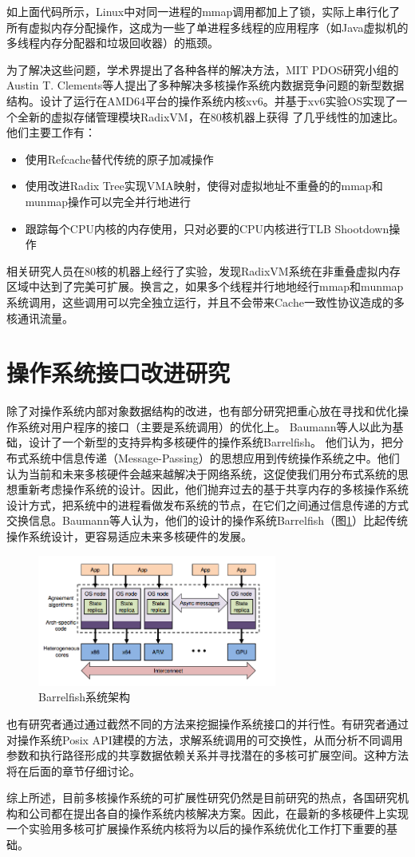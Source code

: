 如上面代码所示，Linux中对同一进程的mmap调用都加上了锁，实际上串行化了所有虚拟内存分配操作，这成为一些了单进程多线程的应用程序（如Java虚拟机的多线程内存分配器和垃圾回收器）的瓶颈。

为了解决这些问题，学术界提出了各种各样的解决方法，MIT
PDOS研究小组的Austin T. Clements等人提出了多种解决多核操作系统内数据竞争问题的新型数据结构\cite{radixvm:eurosys13}。设计了运行在AMD64平台的操作系统内核xv6。并基于xv6实验OS实现了一个全新的虚拟存储管理模块RadixVM，在80核机器上获得
了几乎线性的加速比。他们主要工作有：
\begin{itemize}
\item 使用Refcache替代传统的原子加减操作
\item 使用改进Radix
Tree实现VMA映射，使得对虚拟地址不重叠的的mmap和munmap操作可以完全并行地进行
\item 跟踪每个CPU内核的内存使用，只对必要的CPU内核进行TLB Shootdown操作
\end{itemize}

相关研究人员在80核的机器上经行了实验，发现RadixVM系统在非重叠虚拟内存区域中达到了完美可扩展。换言之，如果多个线程并行地地经行mmap和munmap系统调用，这些调用可以完全独立运行，并且不会带来Cache一致性协议造成的多核通讯流量。

\section{操作系统接口改进研究}
除了对操作系统内部对象数据结构的改进，也有部分研究把重心放在寻找和优化操作系统对用户程序的接口（主要是系统调用）的优化上。
Baumann等人以此为基础，设计了一个新型的支持异构多核硬件的操作系统Barrelfish\cite{Baumann:2009:MNO:1629575.1629579}。
他们认为，把分布式系统中信息传递（Message-Passing）的思想应用到传统操作系统之中。他们认为当前和未来多核硬件会越来越解决于网络系统，这促使我们用分布式系统的思想重新考虑操作系统的设计。因此，他们抛弃过去的基于共享内存的多核操作系统设计方式，把系统中的进程看做发布系统的节点，在它们之间通过信息传递的方式交换信息。Baumann等人认为，他们的设计的操作系统Barrelfish（图\ref{fig:barrelfish}）比起传统操作系统设计，更容易适应未来多核硬件的发展。

\begin{figure}[ht]
\begin{center}
\includegraphics[width=0.7\textwidth]{figures/barrelfish.png}
\end{center}
\caption{Barrelfish系统架构\cite{Baumann:2009:MNO:1629575.1629579}}
\label{fig:barrelfish}
\end{figure}

也有研究者通过通过截然不同的方法来挖掘操作系统接口的并行性。有研究者\cite{commuter:2013}通过对操作系统Posix API建模的方法，求解系统调用的可交换性，从而分析不同调用参数和执行路径形成的共享数据依赖关系并寻找潜在的多核可扩展空间。这种方法将在后面的章节仔细讨论。

综上所述，目前多核操作系统的可扩展性研究仍然是目前研究的热点，各国研究机构和公司都在提出各自的操作系统内核解决方案。因此，在最新的多核硬件上实现一个实验用多核可扩展操作系统内核将为以后的操作系统优化工作打下重要的基础。


